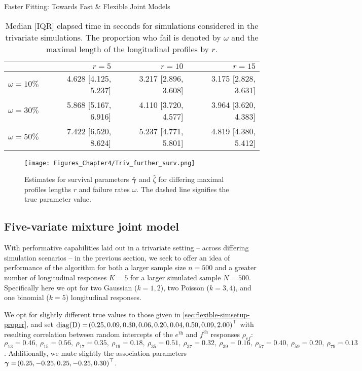 \begin{chapter}{\label{cha:flexible}Faster Fitting: Towards Fast \& Flexible Joint Models}
\begin{table}[h]
    \centering
    \captionsetup{font=scriptsize}
    \begin{tabular}{l:r:r:r}
         &  $r=5$ & $r=10$ & $r=15$  \\
         \hline
        $\omega=10\%$ & 4.628 [4.125, 5.237] & 3.217 [2.896, 3.608] & 3.175 [2.828, 3.631] \\ 
        $\omega=30\%$ & 5.868 [5.167, 6.916] & 4.110 [3.720, 4.577] & 3.964 [3.620, 4.383] \\ 
        $\omega=50\%$ & 7.422 [6.520, 8.624] & 5.237 [4.771, 5.801] & 4.819 [4.380, 5.412] \\ 
    \hline
    \end{tabular}
    \caption{Median [IQR] elapsed time in seconds for simulations considered in the trivariate simulations. The proportion who fail is denoted by $\omega$ and the maximal length of the longitudinal profiles by $r$.}
    \label{tab:flexible-sim-comps-trivfurther}
\end{table}

\begin{figure}[th]
    \centering
    \texttt{[image: Figures\_Chapter4/Triv\_further\_surv.png]}
    \caption{Estimates for survival parameters $\hat{\bm{\gamma}}$ and $\hat{\zeta}$ for differing maximal profiles lengths $r$ and failure rates $\omega$. The dashed line signifies the true parameter value.}
    \label{fig:flexible-sims-triv-further}
\end{figure}

\subsection{Five-variate mixture joint model}\label{sec:flexible-sim-five}
With performative capabilities laid out in a trivariate setting -- across differing simulation scenarios -- in the previous section, we seek to offer an idea of performance of the algorithm for both a larger sample size $n=500$ and a greater number of longitudinal responses $K=5$ for a larger simulated sample $N=500$. Specifically here we opt for two Gaussian ($k=1,2$), two Poisson ($k=3,4$), and one binomial ($k=5$) longitudinal responses.

We opt for slightly different true values to those given in \ref{sec:flexible-simsetup-proper}, and set $\mathrm{diag}\!\left(\mathrm{D}\right) = \!\left(0.25, 0.09, 0.30, 0.06, 0.20, 0.04, 0.50, 0.09, 2.00\right)^\top$ with resulting correlation between random intercepts of the $e^{\mathrm{th}}$ and $f^{\mathrm{th}}$ responses $\rho_{ef}$: $\rho_{13}=0.46,\ \rho_{15}=0.56,\ \rho_{17}=0.35,\ \rho_{19}=0.18,\ \rho_{35} = 0.51,\ \rho_{37} = 0.32,\ \rho_{39}=0.16,\ \rho_{57}=0.40,\ \rho_{59}=0.20,\ \rho_{79}=0.13$. Additionally, we mute slightly the association parameters $\bm{\gamma}=\!\left(0.25,-0.25,0.25,-0.25,0.30\right)^\top$.


\end{chapter}
